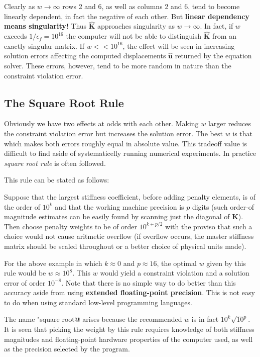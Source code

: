 \documentclass[10pt,b5paper,titlepage]{book}
\newcommand{\m}{\mathbf}
\begin{document}
Clearly as $ w \rightarrow \infty $ rows 2 and 6, as well as columns 2 and 6, tend
to become linearly dependent, in fact the negative of each other. But
\textbf{linear dependency means singularity!} Thus $ \m{\hat{K}} $
approaches singularity as $ w \rightarrow \infty $. In fact, if $ w $ exceeds
$ 1 / \epsilon_f = 10^16 $ the computer will not be able to distinguish
$ \m{\hat{K}} $ from an exactly singular matrix. If $ w << 10^16 $, the
effect will be seen in increasing solution errors affecting the computed
displacements $ \m{\hat{u}} $ returned by the equation solver.
These errors, however, tend to be more random in nature than the constraint
violation error.

\subsection{The Square Root Rule}

Obviously we have two effects at odds with each other. Making $ w $ larger
reduces the constraint violation error but increases the solution error. The
best $ w $ is that which makes both errors roughly equal in absolute value.
This tradeoff value is difficult to find aside of systematicelly running
numerical experiments. In practice \textit{square root rule} is often followed.

This rule can be stated as follows:

Suppose that the largest stiffness coefficient, before adding penalty elements,
is of the order of $ 10^k $ and that the working machine precision is $ p $
digits (such order-of magnitude estimates can be easily found by scanning just
the diagonal of $ \m{K} $). Then choose penalty weights to be of order
$ 10^{k+p/2} $ with the proviso that such a choice would not cause aritmetic
overflow (if overflow occurs, the master stiffness matrix should be scaled
throughout or a better choice of physical units made).

For the above example in which $ k \approx 0 $ and $ p \approx 16 $, the
optimal $ w $ given by this rule would be $ w \approx 10^8 $.
This $ w $ would yield a constraint violation and a solution error of order
$ 10^{-8} $. Note that there is no simple way to do better than this accuracy
aside from using \textbf{extended floating-point precision}. This is not
easy to do when using standard low-level programming languages.

The name "square root@ arises because the recommended $ w $ is in fact
$ 10^k \sqrt{10^p} $. It is seen that picking the weight by this rule requires
knowledge of both stiffness magnitudes and floating-point hardware properties
of the computer used, as well as the precision selected by the program.
\end{document}
